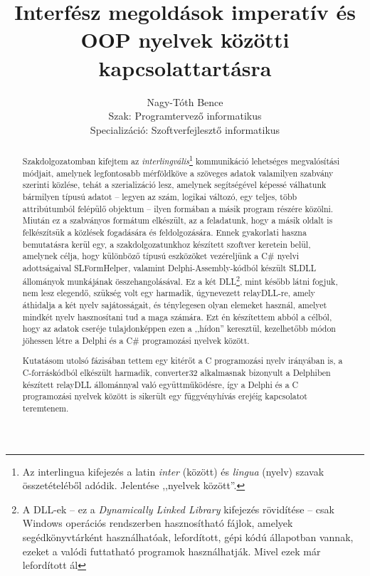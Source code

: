 \documentclass[tocnopagenum]{thesis-ekf}
\begin{document}
	\title{Interfész megoldások imperatív és OOP nyelvek közötti kapcsolattartásra}
	\author{Nagy-Tóth Bence\\Szak: Programtervező informatikus\\Specializáció: Szoftverfejlesztő informatikus}
	\date{\the\year{}}
	\VerbatimFootnotes
	\maketitle
	\tableofcontents
	\begin{abstract}
		Szakdolgozatomban kifejtem az \textit{interlingvális}\footnote{Az interlingua kifejezés a latin \textit{inter} (között) és \textit{lingua} (nyelv) szavak összetételéből adódik. Jelentése ,,nyelvek között''.} kommunikáció lehetséges megvalósítási módjait, amelynek legfontosabb mérföldköve a szöveges adatok valamilyen szabvány szerinti közlése, tehát a szerializáció lesz, amelynek segítségével képessé válhatunk bármilyen típusú adatot -- legyen az szám, logikai változó, egy teljes, több attribútumból felépülő objektum -- ilyen formában a másik program részére közölni. Miután ez a szabványos formátum elkészült, az a feladatunk, hogy a másik oldalt is felkészítsük a közlések fogadására és feldolgozására. Ennek gyakorlati haszna bemutatásra kerül egy, a szakdolgozatunkhoz készített szoftver keretein belül, amelynek célja, hogy különböző típusú eszközöket vezéreljünk a C\# nyelvi adottságaival SLFormHelper, valamint Delphi-Assembly-kódból készült SLDLL állományok munkájának összehangolásával. Ez a két DLL\footnote{A DLL-ek -- ez a \textit{Dynamically Linked Library} kifejezés rövidítése -- csak Windows operációs rendszerben hasznosítható fájlok, amelyek segédkönyvtárként használhatóak, lefordított, gépi kódú állapotban vannak, ezeket a valódi futtatható programok használhatják. Mivel ezek már lefordított ál}, mint később látni fogjuk, nem lesz elegendő, szükség volt egy harmadik, úgynevezett relayDLL-re, amely áthidalja a két nyelv sajátosságait, és ténylegesen olyan elemeket használ, amelyet mindkét nyelv hasznosítani tud a maga számára. Ezt én készítettem abból a célból, hogy az adatok cseréje tulajdonképpen ezen a ,,hídon'' keresztül, kezelhetőbb módon jöhessen létre a Delphi és a C\# programozási nyelvek között. 
		
		Kutatásom utolsó fázisában tettem egy kitérőt a C programozási nyelv irányában is, a C-forráskódból elkészült harmadik, converter32 alkalmasnak bizonyult a Delphiben készített relayDLL állománnyal való együttműködésre, így a Delphi és a C programozási nyelvek között is sikerült egy függvényhívás erejéig kapcsolatot teremtenem.
		

\end{abstract}
\end{document}
